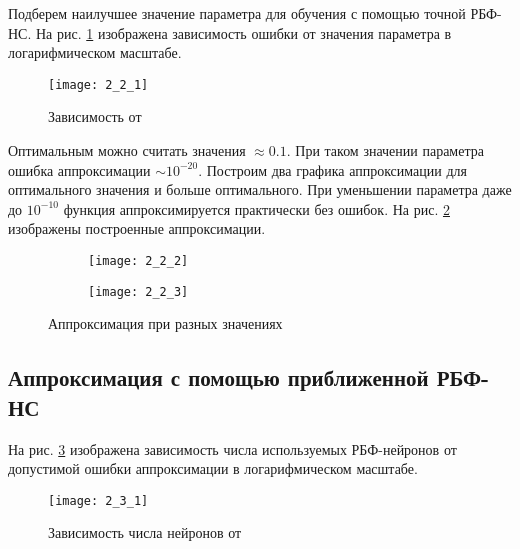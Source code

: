 Подберем наилучшее значение параметра  для обучения с помощью точной РБФ-НС. На рис. \ref{fig:2_2_1} изображена зависимость ошибки  от значения параметра  в логарифмическом масштабе. 
\begin{figure}[H]
\begin{center}
	\texttt{[image: 2\_2\_1]}
	\caption{Зависимость  от }
	\label{fig:2_2_1}
\end{center}
\end{figure}

Оптимальным можно считать значения  $\approx 0.1$. При таком значении параметра ошибка аппроксимации $\sim 10^{-20}$. Построим два графика аппроксимации для оптимального значения  и больше оптимального. При уменьшении параметра даже до $10^{-10}$ функция аппроксимируется практически без ошибок. На рис. \ref{fig:2_2_2} изображены построенные аппроксимации.
\begin{figure}[H]
\begin{center}
	\begin{subfigure}{0.49\textwidth}
		\texttt{[image: 2\_2\_2]}
		\caption{}
	\end{subfigure}
	\begin{subfigure}{0.49\textwidth}
		\texttt{[image: 2\_2\_3]}
		\caption{}
	\end{subfigure}
	\caption{Аппроксимация при разных значениях }
	\label{fig:2_2_2}
\end{center}
\end{figure}

\subsection{Аппроксимация с помощью приближенной РБФ-НС}


На рис. \ref{fig:2_3_1} изображена зависимость числа используемых РБФ-нейронов от допустимой ошибки аппроксимации  в логарифмическом масштабе.
\begin{figure}[H]
\begin{center}
	\texttt{[image: 2\_3\_1]}
	\caption{Зависимость числа нейронов от }
	\label{fig:2_3_1}
\end{center}
\end{figure}

